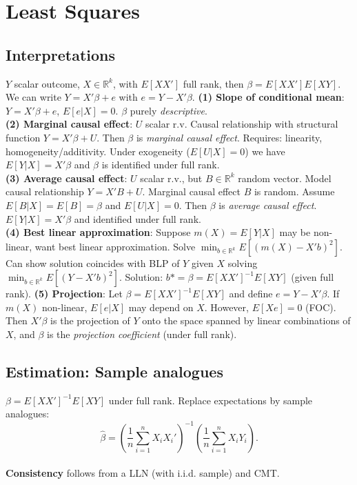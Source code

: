 \section{Least Squares}
\subsection{Interpretations}
$Y$ scalar outcome, $X\in\mathbb{R}^k$, with $E[XX']$ full rank, then $\beta = E[XX']E[XY]$. We can write $Y = X'\beta +e$ with $e = Y-X'\beta$.
\textbf{(1) Slope of conditional mean}: $Y = X'\beta + e$, $E[e|X] = 0$. $\beta$ purely \textit{descriptive}.\\
\textbf{(2) Marginal causal effect}: $U$ scalar r.v. Causal relationship with structural function $Y = X'\beta + U$. Then $\beta$ is \textit{marginal causal effect}. Requires: linearity, homogeneity/additivity. Under exogeneity ($E[U|X] = 0$) we have $E[Y|X] = X'\beta$ and $\beta$ is identified under full rank.\\
\textbf{(3) Average causal effect}: $U$ scalar r.v., but $B\in\mathbb{R}^k$ random vector. Model causal relationship $Y = X'B + U$. Marginal causal effect $B$ is random. Assume $E[B|X] = E[B] = \beta$ and $E[U|X] = 0$. Then $\beta$ is \textit{average causal effect}. $E[Y|X] = X'\beta$ and identified under full rank.\\
\textbf{(4) Best linear approximation}: Suppose $m(X) = E[Y|X]$ may be non-linear, want best linear approximation. Solve $\min_{b\in\mathbb{R}^k}E[(m(X) - X'b)^2]$. Can show solution coincides with BLP of $Y$ given $X$ solving $\min_{b\in\mathbb{R}^k}E[(Y-X'b)^2]$. Solution: $b* = \beta = E[XX']^{-1}E[XY]$ (given full rank).
\textbf{(5) Projection}: Let $\beta = E[XX']^{-1}E[XY]$ and define $e = Y - X'\beta$. If $m(X)$ non-linear, $E[e|X]$ may depend on $X$. However, $E[Xe] = 0$ (FOC). Then $X'\beta$ is the projection of $Y$ onto the space spanned by linear combinations of $X$, and $\beta$ is the \textit{projection coefficient} (under full rank).

\subsection{Estimation: Sample analogues}
$\beta = E[XX']^{-1}E[XY]$ under full rank. Replace expectations by sample analogues:
$$ \hat{\beta} = \left(\frac{1}{n}\sum_{i=1}^nX_iX_i'\right)^{-1}\left(\frac{1}{n}\sum_{i=1}^n X_iY_i\right).$$\\
\textbf{Consistency} follows from a LLN (with i.i.d. sample) and CMT.

